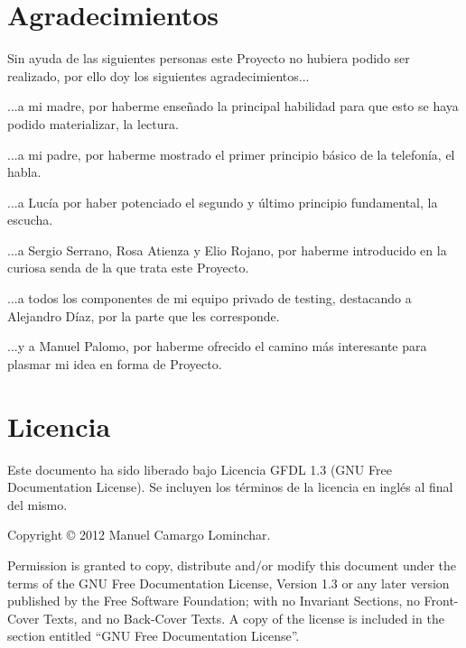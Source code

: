 
\section*{Agradecimientos}

Sin ayuda de las siguientes personas este Proyecto no hubiera podido ser realizado, por ello doy los siguientes agradecimientos...

...a mi madre, por haberme enseñado la principal habilidad para que esto se haya podido materializar, la lectura.

...a mi padre, por haberme mostrado el primer principio básico de la telefonía, el habla.

...a Lucía por haber potenciado el segundo y último principio fundamental, la escucha.

...a Sergio Serrano, Rosa Atienza y Elio Rojano, por haberme introducido en la curiosa senda de la que trata este Proyecto.

...a todos los componentes de mi equipo privado de testing, destacando a Alejandro Díaz, por la parte que les corresponde.

...y a Manuel Palomo, por haberme ofrecido el camino más interesante para plasmar mi idea en forma de Proyecto.

\cleardoublepage

\section*{Licencia}

Este documento ha sido liberado bajo Licencia GFDL 1.3 (GNU Free
Documentation License). Se incluyen los términos de la licencia en
inglés al final del mismo.

Copyright © 2012 Manuel Camargo Lominchar.

Permission is granted to copy, distribute and/or modify this document under the
terms of the GNU Free Documentation License, Version 1.3 or any later version
published by the Free Software Foundation; with no Invariant Sections, no
Front-Cover Texts, and no Back-Cover Texts. A copy of the license is included in
the section entitled ``GNU Free Documentation License''.

\cleardoublepage

